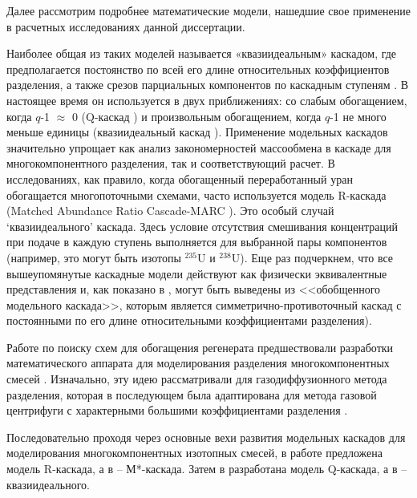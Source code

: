 Далее рассмотрим подробнее математические модели, нашедшие свое применение в расчетных исследованиях данной диссертации.

Наиболее общая из таких моделей называется «квазиидеальным» каскадом, где предполагается постоянство по всей его длине относительных коэффициентов разделения, а также срезов парциальных компонентов по каскадным ступеням \cite{yamamotoMulticomponentIsotopeSeparating1978}.
В настоящее время он используется в двух приближениях: со слабым обогащением, когда $q$-1 $\approx$ 0 (Q-каскад \cite{borisevichNewApproachOptimize2011, kolokoltsovDesignCascadesSeparating1970, zengQCascadeExplanation2012}) и произвольным обогащением, когда $q$-1 не много меньше единицы (квазиидеальный каскад \cite{sulaberidzeSpecialFeaturesEnrichment2006}).
Применение модельных каскадов значительно упрощает как анализ закономерностей массообмена в каскаде для многокомпонентного разделения, так и соответствующий расчет.
В исследованиях, как правило, когда обогащенный переработанный уран обогащается многопоточными схемами, часто используется модель R-каскада (Matched Abundance Ratio Cascade-MARC \cite{kazukihidaSimultaneousEvaluationEffects1986, delagarzaMulticomponentIsotopeSeparation1961, woodEffectsSeparationProcesses2008}).
Это особый случай `квазиидеального' каскада. Здесь условие отсутствия смешивания концентраций при подаче в каждую ступень выполняется для выбранной пары компонентов (например, это могут быть изотопы $^{235}$U и $^{238}$U).
Еще раз подчеркнем, что все вышеупомянутые каскадные модели действуют как физически эквивалентные представления и, как показано в \cite{sulaberidzeClassificationModelCascades2020}, могут быть выведены из <<обобщенного модельного каскада>>, которым является симметрично-противоточный каскад с постоянными по его длине относительными коэффициентами разделения).

Работе по поиску схем для обогащения регенерата предшествовали разработки математического аппарата для моделирования разделения многокомпонентных смесей \cite{delagarzaMulticomponentIsotopeSeparation1961}.
Изначально, эту идею рассматривали для газодиффузионного метода разделения, которая в последующем была адаптирована для метода газовой центрифуги с характерными большими коэффициентами разделения \cite{yamamotoMulticomponentIsotopeSeparating1978}.

Последовательно проходя через основные вехи развития модельных каскадов для моделирования многокомпонентных изотопных смесей, в работе \cite{delagarzaMulticomponentIsotopeSeparation1961} предложена модель R-каскада, а в \cite{levin1963} -- М*-каскада.
Затем в \cite{kolokoltsovDesignCascadesSeparating1970} разработана модель Q-каскада, а в \cite{sazykinKvaziidealnyeKaskadyDlya2000} -- квазиидеального.

